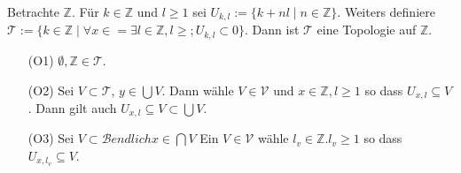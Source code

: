 {
Betrachte $\mathbb{Z}$. Für $k \in \mathbb{Z}$ und $l \ge 1$ sei $U_{k,l} := \{k+nl \mid n \in \mathbb{Z}\}$. 
Weiters definiere $\mathcal{T} := \{ k \in \mathbb{Z} \mid \forall x \in = \exists l \in \mathbb{Z}, l \ge ; U_{k,l} \subset 0\}$.
Dann ist $\mathcal{T}$ eine Topologie auf $\mathbb{Z}$.
\begin{itemize}
    \item[(O1)] $\emptyset, \mathbb{Z} \in \mathcal{T}$.
    \item[(O2)] Sei $V \subset \mathcal{T}$, $y\in \bigcup V$. 
    Dann wähle $V \in \mathcal{V}$ und $x \in \mathbb{Z}, l \ge 1$ so dass $U_{x,l} \subseteq V$.
    Dann gilt auch $U_{x,l} \subseteq V \subset \bigcup V$.
    \item[(O3)] Sei $V \subset\mathcal{B} endlich x \in \bigcap V$ Ein $V \in \mathcal{V}$ 
    wähle $l_v \in \mathbb{Z}. l_v \ge 1$ so dass $U_{x,l_v} \subseteq V$.
\end{itemize}
}